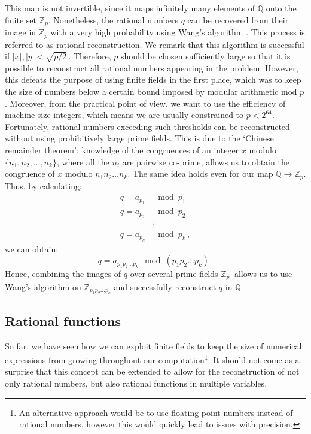 \documentclass[main.tex]{subfiles}
\begin{document}
This map is not invertible, since it maps infinitely many elements of $\mathbb{Q}$ onto the finite set $\mathbb{Z}_p$. Nonetheless, the rational numbers $q$ can be recovered from their image in $\mathbb{Z}_p$ with a very high probability using Wang's algorithm \cite{10.1145/800206.806398, 10.1145/1089292.1089293}. This process is referred to as rational reconstruction. We remark that this algorithm is successful if  $|x|, |y| < \sqrt{p/2}\,$. Therefore, $p$ should be chosen sufficiently large so that it is possible to reconstruct all rational numbers appearing in the problem. However, this defeats the purpose of using finite fields in the first place, which was to keep the size of numbers below a certain bound imposed by modular arithmetic $\text{mod } p\,$. Moreover, from the practical point of view, we want to use the efficiency of machine-size integers, which means we are usually constrained to $p<2^{64}$. Fortunately, rational numbers exceeding such thresholds can be reconstructed without using prohibitively large prime fields. This is due to the `Chinese remainder theorem': knowledge of the congruences of an integer $x$ modulo $\{n_1, n_2, \ldots, n_k\}$, where all the $n_i$ are pairwise co-prime, allows us to obtain the congruence of $x$ modulo $n_1n_2\ldots n_k$. The same idea holds even for our map $\mathbb{Q} \rightarrow \mathbb{Z}_p$. Thus, by calculating:
\begin{align}
    q = a_{p_1} &\mod p_1 \nonumber \\
    q = a_{p_2} &\mod p_2 \nonumber \\
    &\vdots \nonumber \\
    q = a_{p_k} &\mod p_k\,,
\end{align}
we can obtain:
\begin{equation}
    q = a_{p_1 p_2 \ldots p_k} \mod (p_1 p_2 \ldots p_k)\,.
\end{equation}
Hence, combining the images of $q$ over several prime fields $\mathbb{Z}_{p_i}$ allows us to use Wang's algorithm on $\mathbb{Z}_{p_1 p_2 \ldots p_k}$ and successfully reconstruct $q$ in $\mathbb{Q}$.
\subsection{Rational functions} \label{sec:ratfuncs}
So far, we have seen how we can exploit finite fields to keep the size of numerical expressions from growing throughout our computation\footnote{An alternative approach would be to use floating-point numbers instead of rational numbers, however this would quickly lead to issues with precision.}. It should not come as a surprise that this concept can be extended to allow for the reconstruction of not only rational numbers, but also rational functions in multiple variables. 
\end{document}
